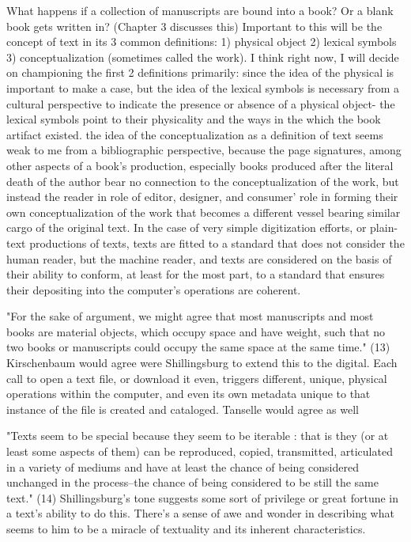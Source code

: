 \documentclass[course, english]{Notes}
\begin{document}
What happens if a collection of manuscripts are bound into a book? Or a blank book gets written in? (Chapter 3 discusses this)
	 {Important to this will be the concept of text in its 3 common definitions: 1) physical object 2) lexical symbols 3) conceptualization (sometimes called the work).}
	 {I think right now, I will decide on championing the first 2 definitions primarily: since the idea of the physical is important to make a case, but the idea of the lexical symbols is necessary from a cultural perspective to indicate the presence or absence of a physical object- the lexical symbols point to their physicality and the ways in the which the book artifact existed.}
	 {the idea of the conceptualization as a definition of text seems weak to me from a bibliographic perspective, because the page signatures, among other aspects of a book's production, especially books produced after the literal death of the author bear no connection to the conceptualization of the work, but instead the reader in role of editor, designer, and consumer' role in forming their own conceptualization of the work that becomes a different vessel bearing similar cargo of the original text.}
	 {In the case of very simple digitization efforts, or plain-text productions of texts, texts are fitted to a standard that does not consider the human reader, but the machine reader, and texts are considered on the basis of their ability to conform, at least for the most part, to a standard that ensures their depositing into the computer's operations are coherent.}
	
"For the sake of argument, we might agree that most manuscripts and most books are material objects, which occupy space and have weight, such that no two books or manuscripts could occupy the same space at the same time." (13)
	 {Kirschenbaum would agree were Shillingsburg to extend this to the digital. Each call to open a text file, or download it even, triggers different, unique, physical operations within the computer, and even its own metadata unique to that instance of the file is created and cataloged.}
	 {Tanselle would agree as well}

"Texts seem to be special because they seem to be iterable : that is they (or at least some aspects of them) can be reproduced, copied, transmitted, articulated in a variety of mediums and have at least the chance of being considered unchanged in the process--the chance of being considered to be still the same text." (14)
	 {Shillingsburg's tone suggests some sort of privilege or great fortune in a text's ability to do this. There's a sense of awe and wonder in describing what seems to him to be a miracle of textuality and its inherent characteristics.}
\end{document}
